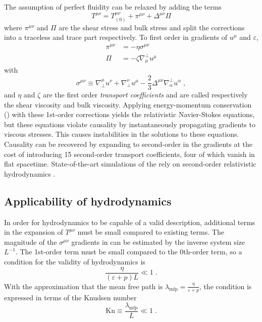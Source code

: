 The assumption of perfect fluidity can be relaxed by adding the terms
\begin{equation}
T^{\mu\nu} = T^{\mu\nu}_{(0)} + \pi^{\mu\nu} + \Delta^{\mu\nu}\Pi
\end{equation}
where $\pi^{\mu\nu}$ and $\Pi$ are the shear stress and bulk stress and split the corrections into a traceless and trace part respectively.
To first order in gradients of $u^\mu$ and $\varepsilon$,
\begin{align}
  \label{eq:shear_stress}
  \pi^{\mu\nu} &= - \eta \sigma^{\mu\nu} \\
  \label{eq:bulk_stress}
  \Pi          &= - \zeta \nabla^\perp_\mu u^\mu
\end{align}
with
\begin{equation}
  \label{eq:sigma_tensor}
  \sigma^{\mu\nu} \equiv \nabla_\perp^\mu u^\nu + \nabla_\perp^\nu u^\mu - \frac{2}{3} \Delta^{\mu\nu}\nabla^\perp_\alpha u^\alpha \; ,
\end{equation}
and $\eta$ and $\zeta$ are the first order \emph{transport coefficients} and are called respectively the shear viscosity and bulk viscosity.
Applying energy-momentum conservation () with these 1st-order corrections yields the relativistic Navier-Stokes equations, but these equations violate causality by instantaneously propagating gradients to viscous stresses.
This causes instabilities in the solutions to these equations.
Causality can be recovered by expanding to second-order in the gradients \cite{Israel:1976tn} at the cost of introducing 15 second-order transport coefficients, four of which vanish in flat spacetime.
State-of-the-art simulations of the \qgp rely on second-order relativistic hydrodynamics \cite{Israel:1979wp}.

\subsection{Applicability of hydrodynamics}

In order for hydrodynamics to be capable of a valid description, additional terms in the expansion of $T^{\mu\nu}$ must be small compared to existing terms.
The magnitude of the $\sigma^{\mu\nu}$ gradients in  can be estimated by the inverse system size $L^{-1}$.
The 1st-order term must be small compared to the 0th-order term, so a condition for the validity of hydrodynamics is %
\begin{equation}
  \frac{\eta}{(\varepsilon + p)L} \ll 1 \;.
\end{equation}
With the approximation that the mean free path is \(\lambda_\textrm{mfp} = \frac{\eta}{\varepsilon + p} \), the condition is expressed in terms of the Knudsen number
\begin{equation}
  \mathrm{Kn} \equiv \frac{\lambda_\textrm{mfp}}{L} \ll 1 \;.
\end{equation}

